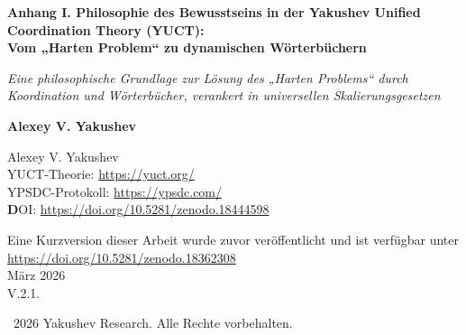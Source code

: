 \documentclass[12pt,a4paper]{article}
\begin{document}
	
	\begin{titlepage}
		\begin{center}
			\vspace*{0cm}
			
			\Huge\textbf{Anhang I. Philosophie des Bewusstseins in der Yakushev Unified Coordination Theory (YUCT):\\ Vom „Harten Problem“ zu dynamischen Wörterbüchern}
			
			\vspace{1cm}
			
			\small\textit{Eine philosophische Grundlage zur Lösung des „Harten Problems“ durch Koordination und Wörterbücher, verankert in universellen Skalierungsgesetzen}
			
			\vspace{0.5cm}
			
			\small\textbf{Alexey V. Yakushev}
			
			\vspace{0.5cm}
			\Large
			Alexey V. Yakushev\\
			
			YUCT-Theorie: \url{https://yuct.org/}\\
			YPSDC-Protokoll: \url{https://ypsdc.com/}\\
			
			
			\vspace{1cm}
			\textbf DOI: \url{https://doi.org/10.5281/zenodo.18444598}\\
			
			\vspace{0.5cm}
			
			\vspace{0cm}
			\large 
			Eine Kurzversion dieser Arbeit wurde zuvor veröffentlicht und ist verfügbar unter\\ \url{https://doi.org/10.5281/zenodo.18362308}\\
			\vspace{1cm}
			März 2026 \\ \large V.2.1.
			
			\vspace{4cm}
			\textcopyright~2026 Yakushev Research. Alle Rechte vorbehalten.
			
			\newpage
			
			\begin{abstract}
				\noindent
				Dieser Artikel bietet eine philosophische Grundlage für die Lösung des „Harten Problems des Bewusstseins“ innerhalb des Rahmens der Unified Coordination Theory (YUCT). Bewusstsein wird nicht als Epiphänomen oder Illusion verstanden, sondern als \textbf{dynamischer Koordinationsprozess}, der durch eine Hierarchie von \textbf{internen Wörterbüchern} implementiert wird. Wir zeigen, dass der klassische Dualismus von „Gehirn–Bewusstsein“ durch ein Drei‑Ebenen‑Modell überwunden wird: \textbf{genetische}, \textbf{neuronale} und \textbf{kulturelle Wörterbücher}. Subjektive Erfahrung wird als Ergebnis der \textbf{Live‑Koordination} zwischen neuronalen Ensembles unter Verteilung gemeinsamer semantischer Räume interpretiert. Das Meta‑Wörterbuch (die Fähigkeit, über die eigenen Zustände zu reflektieren) erklärt das Phänomen der Selbstheit.
				

\end{abstract}
\end{center}
\end{titlepage}
\end{document}
